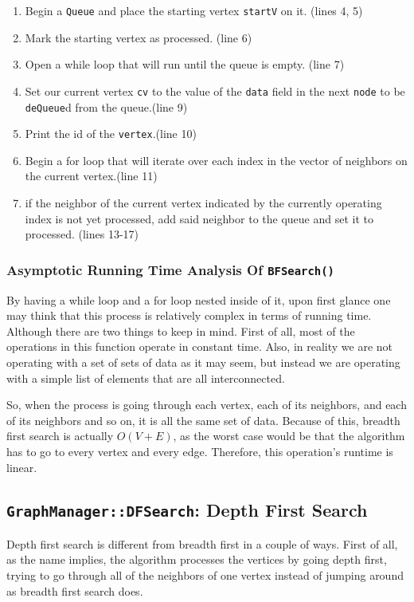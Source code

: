 \documentclass[letterpaper, 10pt]{article}
\begin{document}
\begin{enumerate}
    \item Begin a \texttt{Queue} and place the starting vertex \texttt{startV} on it.  (lines 4, 5)
    \item Mark the starting vertex as processed. (line 6)
    \item Open a while loop that will run until the queue is empty. (line 7)
    \item Set our current vertex \texttt{cv} to the value of the \texttt{data} field in the next \texttt{node} to be \texttt{deQueue}d from the queue.(line 9)
    \item Print the id of the \texttt{vertex}.(line 10)
    \item Begin a for loop that will iterate over each index in the vector of neighbors on the current vertex.(line 11)
    \item if the neighbor of the current vertex indicated by the currently operating index is not yet processed, add said neighbor to the queue and set it to processed. (lines 13-17)
\end{enumerate}
\subsubsection{Asymptotic Running Time Analysis Of \texttt{BFSearch()}}

By having a while loop and a for loop nested inside of it, upon first glance one may think that this process is relatively complex in terms of running time. Although there are two things to keep in mind. First of all, most of the operations in this function operate in constant time. Also, in reality we are not operating with a set of sets of data as it may seem, but instead we are operating with a simple list of elements that are all interconnected.

So, when the process is going through each vertex, each of its neighbors, and each of its neighbors and so on, it is all the same set of data. Because of this, breadth first search is actually $O(V+E)$, as the worst case would be that the algorithm has to go to every vertex and every edge. Therefore, this operation's runtime is linear.

\subsection{\texttt{GraphManager::DFSearch}: Depth First Search}

Depth first search is different from breadth first in a couple of ways. First of all, as the name implies, the algorithm processes the vertices by going depth first, trying to go through all of the neighbors of one vertex instead of jumping around as breadth first search does.
\end{document}
